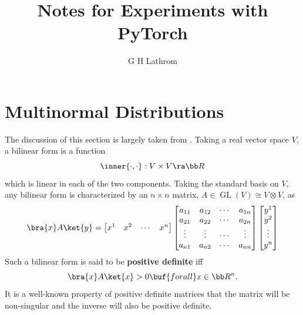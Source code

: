 \documentclass[12pt,letterpaper]{article}
\title{Notes for Experiments with PyTorch}
\author{G H Lathrom}
\begin{document}
\maketitle



\pagestyle{fancy}
\fancyhf{}
\chead{}
\fancyfoot[C]{\thepage}
\renewcommand{\headrulewidth}{.5pt}


\section{Multinormal Distributions}

The discussion of this section is largely taken from \cite[Sec.2.5]{multivariate-analysis}.
Taking a real vector space $V$, a bilinear form is a function
\begin{equation*}
	\inner{\cdot,\cdot} : V \times V \ra \bb R
\end{equation*}
which is linear in each of the two components.
Taking the standard basis on $V$, any bilinear form is characterized by an $n\times n$ matrix, $A \in \operatorname{GL}(V) \cong V\otimes V$, as
\begin{equation*}
	\bra{x}A\ket{y} = 
	\begin{bmatrix}
		x^1 & x^2 & \cdots & x^n
	\end{bmatrix} 
	\begin{bmatrix}
		a_{11} & a_{12} & \cdots & a_{1n} \\
		a_{21} & a_{22} & \cdots & a_{2n} \\
		\vdots & \vdots & \cdots & \vdots \\
		a_{n1} & a_{n2} & \cdots & a_{nn} \\
	\end{bmatrix}
	\begin{bmatrix}
		y^1 \\ y^2 \\ \vdots \\ y^n
	\end{bmatrix}
\end{equation*}
Such a bilinear form is said to be \textbf{positive definite} iff
\begin{equation*}
	\bra{x}A\ket{x} > 0 \buf{for all} x \in \bb R^n.
\end{equation*}
It is a well-known property of positive definite matrices that the matrix will be non-singular and the inverse will also be positive definite.  
\end{document}
